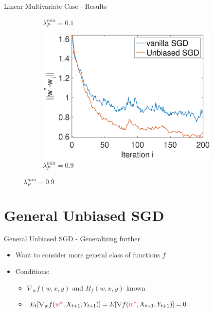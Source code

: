 \documentclass{beamer}
\begin{document}
\begin{frame}{Linear Multivariate Case - Results}
\begin{figure}[h]
\begin{subfigure}{0.45\textwidth}
        \caption{$\lambda_P^{min}=0.1$}
        \label{fig:image1}
    \end{subfigure}
    \hfill
    \begin{subfigure}{0.45\textwidth}
        \centering
        \includegraphics[width=\textwidth]{AR1_rho09Multivariate.eps}
        \caption{$\lambda_P^{min}=0.9$}
        \label{fig:image2}
    \end{subfigure}
    \vspace{-10pt}
    \label{fig:side_by_side}
\end{figure}
\end{frame}

\section{General Unbiased SGD}
\begin{frame}{General Unbiased SGD - Generalizing further}
    \begin{itemize}
        \item Want to consider more general class of functions $f$
        \item Conditions:
        \begin{itemize}
            \item $\nabla_w f(w,x,y)$ and $H_f(w,x,y)$ known
            \item $E_t[\nabla_w f(\textcolor{red}{w^*},X_{t+1},Y_{t+1})]=E[\nabla f(\textcolor{red}{w^*},X_{t+1},Y_{t+1})]=0$
        \end{itemize}
    \end{itemize}
\end{frame}
\end{document}
